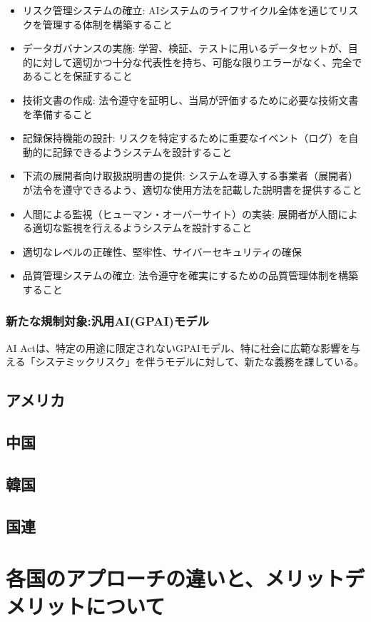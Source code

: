 \begin{itemize}
    \item リスク管理システムの確立: AIシステムのライフサイクル全体を通じてリスクを管理する体制を構築すること
    \item データガバナンスの実施: 学習、検証、テストに用いるデータセットが、目的に対して適切かつ十分な代表性を持ち、可能な限りエラーがなく、完全であることを保証すること
    \item 技術文書の作成: 法令遵守を証明し、当局が評価するために必要な技術文書を準備すること
    \item 記録保持機能の設計: リスクを特定するために重要なイベント（ログ）を自動的に記録できるようシステムを設計すること
    \item 下流の展開者向け取扱説明書の提供: システムを導入する事業者（展開者）が法令を遵守できるよう、適切な使用方法を記載した説明書を提供すること
    \item 人間による監視（ヒューマン・オーバーサイト）の実装: 展開者が人間による適切な監視を行えるようシステムを設計すること
    \item 適切なレベルの正確性、堅牢性、サイバーセキュリティの確保
    \item 品質管理システムの確立: 法令遵守を確実にするための品質管理体制を構築すること
\end{itemize}

\subsubsection{新たな規制対象:汎用AI(GPAI)モデル}
AI Actは、特定の用途に限定されないGPAIモデル、特に社会に広範な影響を与える「システミックリスク」を伴うモデルに対して、新たな義務を課している。



\subsection{アメリカ}

\subsection{中国}

\subsection{韓国}

\subsection{国連}

\section{各国のアプローチの違いと、メリットデメリットについて}
